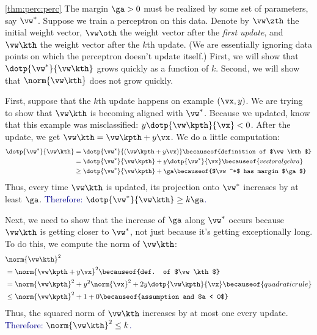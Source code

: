 \begin{myproof}{\ref{thm:perc:perc}}
  The margin $\ga > 0$ must be realized by some set of parameters, say
  $\vw^*$.  Suppose we train a perceptron on this data.  Denote by
  $\vw\zth$ the initial weight vector, $\vw\oth$ the weight vector
  after the \emph{first update}, and $\vw\kth$ the weight vector after
  the $k$th update.  (We are essentially ignoring data points on which
  the perceptron doesn't update itself.)  First, we will show that
  $\dotp{\vw^*}{\vw\kth}$ grows quickly as a function of $k$.  Second,
  we will show that $\norm{\vw\kth}$ does not grow quickly.

  First, suppose that the $k$th update happens on example $(\vx,y)$.
  We are trying to show that $\vw\kth$ is becoming aligned with
  $\vw^*$.  Because we updated, know that this example was
  misclassified: $y \dotp{\vw\kpth}{\vx} < 0$.  After the update, we get
  $\vw\kth = \vw\kpth + y \vx$.  We do a little computation:
  \begin{align}
    \dotp{\vw^*}{\vw\kth}
    &= \dotp{\vw^*}{\left(\vw\kpth + y \vx\right)}
         \becauseof{definition of $\vw\kth$}
    \\
    &= \dotp{\vw^*}{\vw\kpth} + y \dotp{\vw^*}{\vx}
         \becauseof{vector algebra}
    \\
    &\geq \dotp{\vw^*}{\vw\kpth} + \ga
         \becauseof{$\vw^*$ has margin $\ga$}
  \end{align}
  Thus, every time $\vw\kth$ is updated, its projection onto $\vw^*$
  increases by at least $\ga$.  \textcolor{darkblue}{Therefore:
    $\dotp{\vw^*}{\vw\kth} \geq k \ga$.}

  Next, we need to show that the increase of $\ga$ along $\vw^*$
  occurs because $\vw\kth$ is getting closer to $\vw^*$, not just
  because it's getting exceptionally long.  To do this, we compute the
  norm of $\vw\kth$:
  \begin{align}
    & \norm{\vw\kth}^2 \nonumber\\
    &= \norm{\vw\kpth + y \vx}^2
         \becauseof{def. of $\vw\kth$} \\
    &= \norm{\vw\kpth}^2 + y^2 \norm{\vx}^2 + 2 y \dotp{\vw\kpth}{\vx}
         \becauseof{quadratic rule} \\
    &\leq \norm{\vw\kpth}^2 + 1 + 0
         \becauseof{assumption and $a < 0$}
  \end{align}
  Thus, the squared norm of $\vw\kth$ increases by at most one every
  update.  \textcolor{darkblue}{Therefore: $\norm{\vw\kth}^2 \leq k$.}


\end{myproof}
